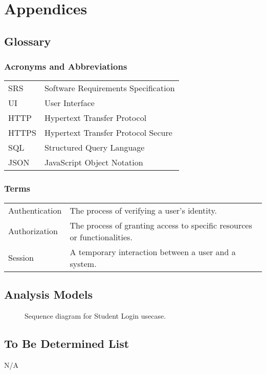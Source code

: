 \documentclass{scrreprt}
\begin{document}
\chapter*{Appendices}
\renewcommand{\thesection}{\Alph{section}}

\section{Glossary}
\subsection*{Acronyms and Abbreviations}
\begin{tabularx}{\textwidth}{|l|X|}
\hline
SRS & Software Requirements Specification\\
UI & User Interface\\
HTTP & Hypertext Transfer Protocol\\
HTTPS & Hypertext Transfer Protocol Secure\\
SQL & Structured Query Language\\
JSON & JavaScript Object Notation\\
\hline
\end{tabularx}

\subsection*{Terms}
\begin{tabularx}{\textwidth}{|l|X|}
\hline
Authentication & The process of verifying a user's identity.\\
Authorization & The process of granting access to specific resources or functionalities.\\
Session & A temporary interaction between a user and a system.\\
\hline
\end{tabularx}





\section{Analysis Models}

\begin{figure}[h]
    \centering
    \caption{Sequence diagram for Student Login usecase.}
    \label{fig:seq-diagram}
\end{figure}




\section{To Be Determined List}
N/A
\end{document}
